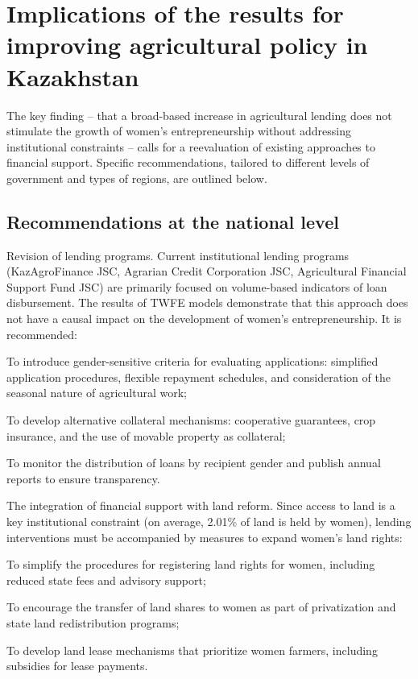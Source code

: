 \documentclass[pdflatex,sn-mathphys-ay]{sn-jnl}
\begin{document}
\section{Implications of the results for improving agricultural policy in Kazakhstan}

The key finding -- that a broad-based increase in agricultural lending
does not stimulate the growth of women's entrepreneurship without
addressing institutional constraints -- calls for a reevaluation of
existing approaches to financial support. Specific recommendations,
tailored to different levels of government and types of regions, are
outlined below.

\subsection{Recommendations at the national level}

Revision of lending programs. Current institutional lending programs
(KazAgroFinance JSC, Agrarian Credit Corporation JSC, Agricultural
Financial Support Fund JSC) are primarily focused on volume-based
indicators of loan disbursement. The results of TWFE models demonstrate
that this approach does not have a causal impact on the development of
women's entrepreneurship. It is recommended:

To introduce gender-sensitive criteria for evaluating applications:
simplified application procedures, flexible repayment schedules, and
consideration of the seasonal nature of agricultural work;

To develop alternative collateral mechanisms: cooperative guarantees,
crop insurance, and the use of movable property as collateral;

To monitor the distribution of loans by recipient gender and publish
annual reports to ensure transparency.

The integration of financial support with land reform. Since access to
land is a key institutional constraint (on average, 2.01\% of land is
held by women), lending interventions must be accompanied by measures to
expand women's land rights:

To simplify the procedures for registering land rights for women,
including reduced state fees and advisory support;

To encourage the transfer of land shares to women as part of
privatization and state land redistribution programs;

To develop land lease mechanisms that prioritize women farmers,
including subsidies for lease payments.
\end{document}
